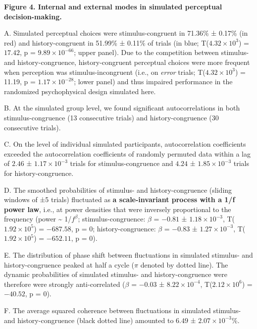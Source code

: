 \documentclass[
]{article}
\begin{document}
\textbf{Figure 4. Internal and external modes in simulated perceptual
decision-making.}

A. Simulated perceptual choices were stimulus-congruent in 71.36\% ±
0.17\% (in red) and history-congruent in 51.99\% ± 0.11\% of trials (in
blue; T(\(\ensuremath{4.32\times 10^{3}}\)) = \(17.42\), p =
\(\ensuremath{9.89\times 10^{-66}}\); upper panel). Due to the
competition between stimulus- and history-congruence, history-congruent
perceptual choices were more frequent when perception was
stimulus-incongruent (i.e., on \emph{error} trials;
T(\ensuremath{4.32\times 10^{3}}) = 11.19, p =
\(\ensuremath{1.17\times 10^{-28}}\); lower panel) and thus impaired
performance in the randomized psychophysical design simulated here.

B. At the simulated group level, we found significant autocorrelations
in both stimulus-congruence (13 consecutive trials) and
history-congruence (30 consecutive trials).

C. On the level of individual simulated participants, autocorrelation
coefficients exceeded the autocorrelation coefficients of randomly
permuted data within a lag of \(2.46\) ±
\(\ensuremath{1.17\times 10^{-3}}\) trials for stimulus-congruence and
\(4.24\) ± \(\ensuremath{1.85\times 10^{-3}}\) trials for
history-congruence.

D. The smoothed probabilities of stimulus- and history-congruence
(sliding windows of ±5 trials) fluctuated as \textbf{a scale-invariant
process with a 1/f power law}, i.e., at power densities that were
inversely proportional to the frequency (power \textasciitilde{}
1/\(f^\beta\); stimulus-congruence: \(\beta\) = \(-0.81\) ±
\(\ensuremath{1.18\times 10^{-3}}\),
T(\(\ensuremath{1.92\times 10^{5}}\)) = \(-687.58\), p = \(0\);
history-congruence: \(\beta\) = \(-0.83\) ±
\(\ensuremath{1.27\times 10^{-3}}\),
T(\(\ensuremath{1.92\times 10^{5}}\)) = \(-652.11\), p = \(0\)).

E. The distribution of phase shift between fluctuations in simulated
stimulus- and history-congruence peaked at half a cycle (\(\pi\) denoted
by dotted line). The dynamic probabilities of simulated stimulus- and
history-congruence were therefore were strongly anti-correlated
(\(\beta\) = \(-0.03\) ± \(\ensuremath{8.22\times 10^{-4}}\),
T(\(\ensuremath{2.12\times 10^{6}}\)) = \(-40.52\), p = \(0\)).

F. The average squared coherence between fluctuations in simulated
stimulus- and history-congruence (black dotted line) amounted to
\(6.49\) ± \(\ensuremath{2.07\times 10^{-3}}\)\%.
\end{document}

